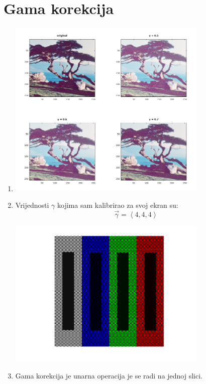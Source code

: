 \documentclass[12pt, a4]{report}
\begin{document}
        \section{Gama korekcija}
            \begin{enumerate}
                \item
                    \begin{minipage}{\linewidth}
                        \centering
                        \includegraphics[width=0.75\textwidth]{gamma}
                    \end{minipage}
                \item
                    Vrijednosti $\gamma$ kojima sam kalibrirao za svoj ekran su:
                    \begin{equation}
                        \vec \gamma = \left< 4, 4, 4 \right>
                    \end{equation}
                    \begin{minipage}{\linewidth}
                        \centering
                        \includegraphics[width=0.75\textwidth]{gamma_correction}
                    \end{minipage}
                \item
                    Gama korekcija je unarna operacija je se radi na jednoj slici.
            \end{enumerate}
\end{document}

